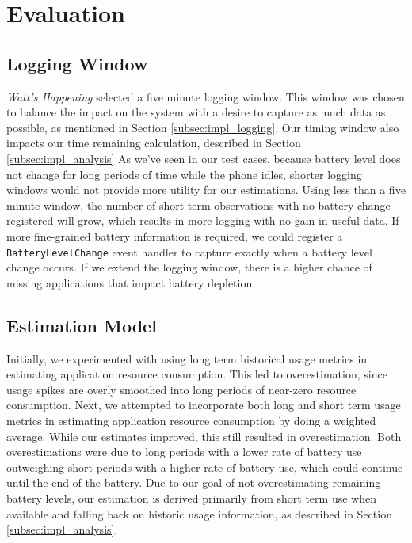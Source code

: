 \section{Evaluation}
\label{sec:evaluation}

\subsection{Logging Window}
\emph{Watt's Happening} selected a five minute logging window.
This window was chosen to balance the impact on the system with a desire to capture as much data as possible, as mentioned in Section \ref{subsec:impl_logging}.
Our timing window also impacts our time remaining calculation, described in Section \ref{subsec:impl_analysis} 
As we've seen in our test cases, because battery level does not change for long periods of time while the phone idles, shorter logging windows would not provide more utility for our estimations. %
Using less than a five minute window, the number of short term observations with no battery change registered will grow, which results in more logging with no gain in useful data.
If more fine-grained battery information is required, we could register a \texttt{BatteryLevelChange} event handler to capture exactly when a battery level change occurs.
If we extend the logging window, there is a higher chance of missing applications that impact battery depletion.

\subsection{Estimation Model}
Initially, we experimented with using long term historical usage metrics in estimating application resource consumption.
This led to overestimation, since usage spikes are overly smoothed into long periods of near-zero resource consumption.
Next, we attempted to incorporate both long and short term usage metrics in estimating application resource consumption by doing a weighted average.
While our estimates improved, this still resulted in overestimation. 
Both overestimations were due to long periods with a lower rate of battery use outweighing short periods with a higher rate of battery use, which could continue until the end of the battery.
Due to our goal of not overestimating remaining battery levels, our estimation is derived primarily from short term use when available and falling back on historic usage information, as described in Section \ref{subsec:impl_analysis}.

